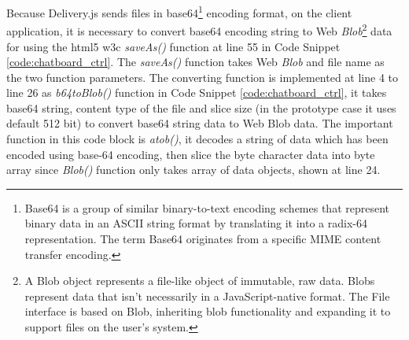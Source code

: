 \par Because Delivery.js sends files in base64\footnote{Base64 is a group of similar binary-to-text encoding schemes that represent binary data in an ASCII string format by translating it into a radix-64 representation. The term Base64 originates from a specific MIME content transfer encoding.\cite{wiki:base64}} encoding format, on the client application, it is necessary to convert base64 encoding string to Web \textit{Blob}\footnote{A Blob object represents a file-like object of immutable, raw data. Blobs represent data that isn't necessarily in a JavaScript-native format. The File interface is based on Blob, inheriting blob functionality and expanding it to support files on the user's system.\cite{mdn:blob}} data for using the \gls{html5} \gls{w3c} \textit{saveAs()} function at line 55 in Code Snippet \ref{code:chatboard_ctrl}. The \textit{saveAs()} function takes Web \textit{Blob} and file name as the two function parameters. The converting function is implemented at line 4 to line 26 as \textit{b64toBlob()} function in Code Snippet \ref{code:chatboard_ctrl}, it takes base64 string, content type of the file and slice size (in the prototype case it uses default 512 bit) to convert base64 string data to Web Blob data. The important function in this code block is \textit{atob()}, it decodes a string of data which has been encoded using base-64 encoding, then slice the byte character data into byte array since \textit{Blob()} function only takes array of data objects, shown at line 24.

